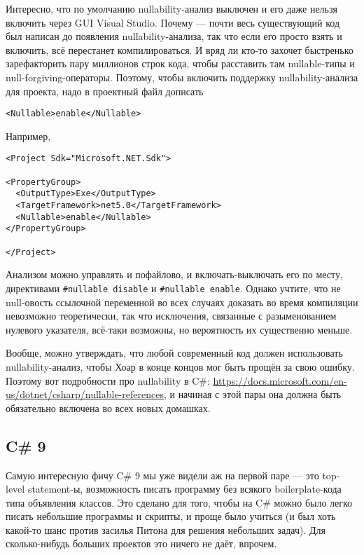 \documentclass[a5paper]{article}
\begin{document}
Интересно, что по умолчанию nullability-анализ выключен и его даже нельзя включить через GUI Visual Studio. Почему --- почти весь существующий код был написан до появления nullability-анализа, так что если его просто взять и включить, всё перестанет компилироваться. И вряд ли кто-то захочет быстренько зарефакторить пару миллионов строк кода, чтобы расставить там nullable-типы и null-forgiving-операторы. Поэтому, чтобы включить поддержку nullability-анализа для проекта, надо в проектный файл дописать

\begin{verbatim}
<Nullable>enable</Nullable>
\end{verbatim}

Например,

\begin{verbatim}
<Project Sdk="Microsoft.NET.Sdk">

<PropertyGroup>
  <OutputType>Exe</OutputType>
  <TargetFramework>net5.0</TargetFramework>
  <Nullable>enable</Nullable>
</PropertyGroup>

</Project>
\end{verbatim}

Анализом можно управлять и пофайлово, и включать-выключать его по месту, директивами \texttt{#nullable disable} и \texttt{#nullable enable}. Однако учтите, что не null-овость ссылочной переменной во всех случаях доказать во время компиляции невозможно теоретически, так что исключения, связанные с разыменованием нулевого указателя, всё-таки возможны, но вероятность их существенно меньше.

Вообще, можно утверждать, что любой современный код должен использовать nullability-анализ, чтобы Хоар в конце концов мог быть прощён за свою ошибку. Поэтому вот подробности про nullability в C\#: \url{https://docs.microsoft.com/en-us/dotnet/csharp/nullable-references}, и начиная с этой пары она должна быть обязательно включена во всех новых домашках.

\subsection{C\# 9}

Самую интересную фичу C\# 9 мы уже видели аж на первой паре --- это top-level statement-ы, возможность писать программу без всякого boilerplate-кода типа объявления классов. Это сделано для того, чтобы на C\# можно было легко писать небольшие программы и скрипты, и проще было учиться (и был хоть какой-то шанс против засилья Питона для решения небольших задач). Для сколько-нибудь больших проектов это ничего не даёт, впрочем.
\end{document}
